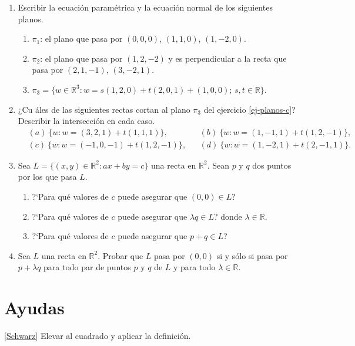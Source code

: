 \begin{enumerate}[resume,topsep=6pt, itemsep=.4cm]
\item\label{ej-planos} Escribir la ecuación paramétrica  y la ecuación normal de los siguientes planos.
\begin{enumerate}
    \item $\pi_1$: el plano que pasa por $(0,0,0)$, $(1,1,0)$, $(1,-2,0)$.
    \item $\pi_2$: el plano que pasa por $(1,2,-2)$ y es perpendicular a la
    recta que pasa por $(2,1,-1)$, $(3,-2,1)$.
    \item\label{ej-planos-c}  $\pi_3=\{w\in\mathbb{R}^3: w=s(1,2,0)+t(2,0,1)+(1,0,0);\,s,t\in \mathbb R\}$.
\end{enumerate}



\item ¿Cu áles de las siguientes rectas cortan al plano $\pi_3$ del  ejercicio  \ref{ej-planos-c}?
Describir la intersección en cada caso.
\begin{align*}
&(a) \ \{w: w=(3,2,1)+t(1,1,1)\}, && (b) \  \{w: w=(1,-1,1)+t(1,2,-1)\}, \\
&(c)\  \{w: w=(-1,0,-1)+t(1,2,-1)\}, && (d) \  \{w: w=(1,-2,1)+t(2,-1,1)\}.
\end{align*}


\item\label{rectas como subespacio} Sea $L=\{(x,y)\in\mathbb{R}^2 : ax+by=c\}$ una recta en $\mathbb{R}^2$. Sean $p$ y $q$ dos puntos por los que pasa $L$.
\begin{enumerate}
 \item ?`Para qué valores de $c$ puede asegurar que $(0,0)\in L$?
 \item ?`Para qué valores de $c$ puede asegurar que $\lambda q\in L$? donde $\lambda\in\mathbb{R}$.
 \item ?`Para qué valores de $c$ puede asegurar que $p+q\in L$?
\end{enumerate}


\item Sea $L$ una recta en $\mathbb{R}^2$. Probar que $L$ pasa por $(0,0)$ si y sólo si pasa por $p+\lambda q$ para todo par de puntos $p$ y $q$ de $L$ y para todo $\lambda\in\mathbb{R}$.
\end{enumerate}


\section*{Ayudas}
 \ref{Schwarz} Elevar al cuadrado y aplicar la definición.

